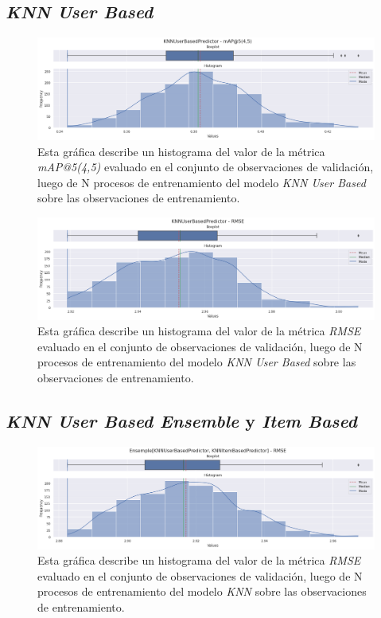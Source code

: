 \documentclass[11pt,a4paper,twoside]{thesis}
\begin{document}
\subsection{\textit{KNN User Based}}

\begin{figure}[!htb]
	\centering
	\includegraphics[width=15cm]{./images/metrics-knn-user-based-mapk.png}
	\caption{Esta gráfica describe un histograma del valor de la métrica \textit{mAP@5(4,5)} evaluado en el conjunto de observaciones de validación, luego de N procesos de entrenamiento del modelo \textit{KNN User Based} sobre las observaciones de entrenamiento.}
\end{figure}

\begin{figure}[!htb]
	\centering
	\includegraphics[width=15cm]{./images/metrics-knn-user-based-RMSE.png}
	\caption{Esta gráfica describe un histograma del valor de la métrica \textit{RMSE} evaluado en el conjunto de observaciones de validación, luego de N procesos de entrenamiento del modelo \textit{KNN User Based} sobre las observaciones de entrenamiento.}
\end{figure}

\clearpage

\subsection{\textit{KNN User Based Ensemble} y \textit{Item Based}}

\begin{figure}[!htb]
	\centering
	\includegraphics[width=15cm]{./images/metrics-knn-ensemple-RMSE.png}
	\caption{Esta gráfica describe un histograma del valor de la métrica \textit{RMSE} evaluado en el conjunto de observaciones de validación, luego de N procesos de entrenamiento del modelo \textit{KNN} sobre las observaciones de entrenamiento.}
\end{figure}
\end{document}
